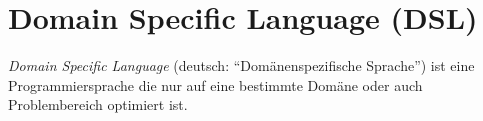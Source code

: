 \section{Domain Specific Language (DSL)}
\label{sec:dsl}

\emph{Domain Specific Language} (deutsch: \enquote{Domänenspezifische Sprache}) ist eine Programmiersprache die nur auf eine bestimmte Domäne oder auch Problembereich optimiert ist.